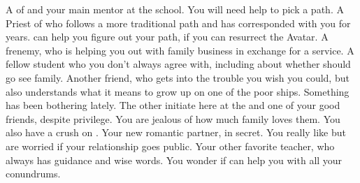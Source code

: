 \documentclass[char]{GL2020}
\begin{document}
\begin{contacts}
    \contact{\cFlowPriest{}} A \cFlowPriest{\cleric} of \cFlow{} and your main mentor at the school. You will need \cFlowPriest{\their} help to pick a path.
    \contact{\cEbbPriest{}} A Priest of \cEbb{} who follows a more traditional path and has corresponded with you for years. \cEbbPriest{\They} can help you figure out your path, if you can resurrect the Avatar.
    \contact{\cHeir{}} A frenemy, who is helping you out with family business in exchange for a service.
    \contact {\cPresident{}} A fellow student who you don’t always agree with, including about whether \cInitiate{} should go see \cInitiate{\their} family.
    \contact{\cPirateChild{}} Another friend, who gets into the trouble you wish you could, but also understands what it means to grow up on one of the poor ships. Something has been bothering \cPirateChild{} lately.
    \contact{\cInitiate{}} The other \pShippie{} initiate here at the \pSc{} and one of your good friends, despite \cInitiate{\their} privilege. You are jealous of how much \cInitiate{\their} family loves them. You also have a crush on \cInitiate{}.
    \contact{\cTechStar{}} Your new romantic partner, in secret. You really like \cTechStar{\them} but are worried if your relationship goes public.
    \contact{\cEthics{}} Your other favorite teacher, who always has guidance and wise words.  You wonder if \cEthics{\they} can help you with all your conundrums.
\end{contacts}
\end{document}
